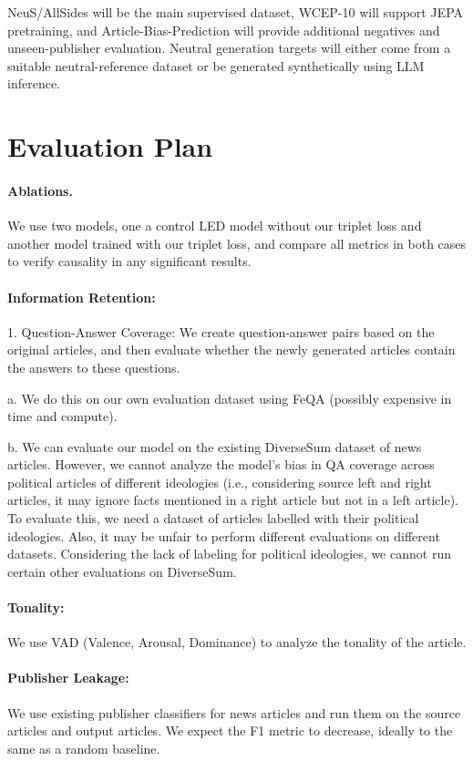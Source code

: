 \documentclass[11pt]{article}
\begin{document}
NeuS/AllSides will be the main supervised dataset, WCEP-10 will support JEPA pretraining, and Article-Bias-Prediction will provide additional negatives and unseen-publisher evaluation. Neutral generation targets will either come from a suitable neutral-reference dataset or be generated synthetically using LLM inference.

\section{Evaluation Plan}

\paragraph{Ablations.} We use two models, one a control LED model without our triplet loss and another model trained with our triplet loss, and compare all metrics in both cases to verify causality in any significant results.

\paragraph{Information Retention:}

1. Question-Answer Coverage: We create question-answer pairs based on the original articles, and then evaluate whether the newly generated articles contain the answers to these questions.

a. We do this on our own evaluation dataset using FeQA \citep{durmus2020feqa} (possibly expensive in time and compute).

b. We can evaluate our model on the existing DiverseSum dataset of news articles. However, we cannot analyze the model's bias in QA coverage across political articles of different ideologies (i.e., considering source left and right articles, it may ignore facts mentioned in a right article but not in a left article). To evaluate this, we need a dataset of articles labelled with their political ideologies. Also, it may be unfair to perform different evaluations on different datasets. Considering the lack of labeling for political ideologies, we cannot run certain other evaluations on DiverseSum.
\paragraph{Tonality:} We use VAD (Valence, Arousal, Dominance) to analyze the tonality of the article.
\paragraph{Publisher Leakage:} We use existing publisher classifiers for news articles and run them on the source articles and output articles. We expect the F1 metric to decrease, ideally to the same as a random baseline.
\end{document}
